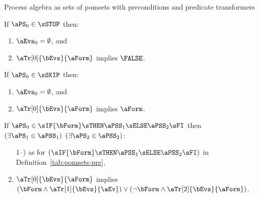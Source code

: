 
Process algebra as sets of pomsets with preconditions and predicate
transformers
\begin{definition}
  If $\aPS_0\in\sSTOP$ then:
  \begin{enumerate}
    \item $\aEvs_0 = \emptyset$, and
  \item $\aTr[0]{\bEvs}{\aForm}$ implies $\FALSE$.
  \end{enumerate}

  \noindent
  If $\aPS_0\in\sSKIP$ then:
  \begin{enumerate}
  \item $\aEvs_0 = \emptyset$, and
  \item $\aTr[0]{\bEvs}{\aForm}$ implies $\aForm$.
  \end{enumerate}

  \noindent
  If $\aPS_0 \in \sIF{\bForm}\sTHEN\aPSS_1\sELSE\aPSS_2\sFI$ then
  $(\exists\aPS_1\in\aPSS_1)$ $(\exists\aPS_2\in\aPSS_2)$:
  \begin{enumerate}
  \setcounter{enumi}{\value{pomsetPreIfXount}}
  \item[1--\thepomsetPreIfXount)] as for $(\sIF{\bForm}\sTHEN\aPSS_1\sELSE\aPSS_2\sFI)$ in Definition~\ref{tab:pomsets-pre},
  \item $\aTr[0]{\bEvs}{\aForm}$ implies $(\bForm\land\aTr[1]{\bEvs}{\aEv})\lor(\neg\bForm\land\aTr[2]{\bEvs}{\aForm})$.
  \end{enumerate}


\end{definition}
